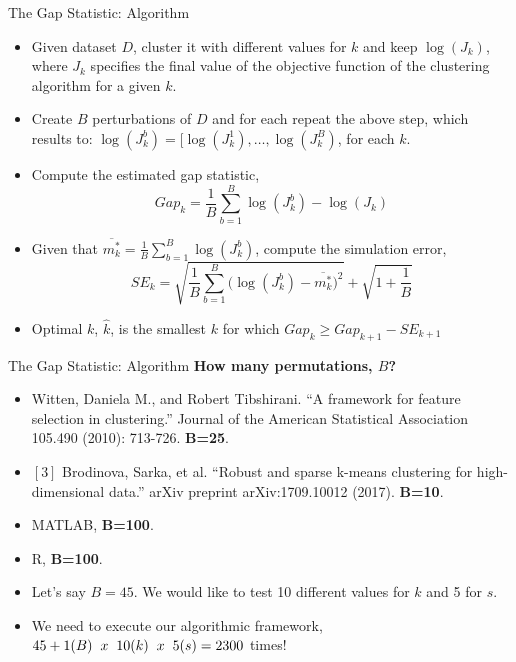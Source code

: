 \documentclass{beamer}
\newlength{\tmpShadow}
\newcommand{\MyShadow}[2]{%
	\settowidth{\tmpShadow}{#1}
	\addtolength{\tmpShadow}{.1em}
	\raisebox{-0.25ex}{\textcolor{gray!70}{#1}}%
	\kern-\tmpShadow%
	\textcolor{#2}{#1}%
}
\begin{document}
{\begin{frame}{The Gap Statistic: Algorithm}
	\begin{itemize}[label={\MyShadow{$\bullet$}{blue!80}}]
		\item Given dataset $D$, cluster it with different values for $k$ and keep $\log(J_k)$, where $J_k$ specifies the final value of the objective function of the clustering algorithm for a given $k$.
		\item Create $B$ perturbations of $D$ and for each repeat the above step, which results to: $\log(J_k^b) = [\log(J_k^1),\dots,\log(J_k^B)$, for each $k$.
		\item Compute the estimated gap statistic, 
		\begin{equation}\nonumber
		Gap_k = \frac{1}{B}\sum_{b=1}^{B}\log(J_k^b) - \log(J_k)
		\end{equation}
		\item Given that $\overline{m_k^*} = \frac{1}{B}\sum_{b=1}^{B}\log(J_k^b)$, compute the simulation error,
		\begin{equation}\nonumber
		SE_k = \sqrt{\frac{1}{B}\sum_{b=1}^{B}\bigg(\log(J_k^b)-\overline{m_k^*}\bigg)^2} + \sqrt{1+\frac{1}{B}}
		\end{equation}		
		\item Optimal $k$, $\hat{k}$, is the smallest $k$ for which $Gap_k \geq Gap_{k+1}-SE_{k+1}$ 
	\end{itemize}
\end{frame}

\begin{frame}{The Gap Statistic: Algorithm}
	\textbf{How many permutations, $B$?}
	\begin{itemize}[label={\MyShadow{$\bullet$}{blue!80}}]
		\item<2-> Witten, Daniela M., and Robert Tibshirani. ``A framework for feature selection in clustering.'' Journal of the American Statistical Association 105.490 (2010): 713-726. \textbf{B=25}.
		\vspace{3mm}	
		\item<2-> $[3]$ Brodinova, Sarka, et al. ``Robust and sparse k-means clustering for high-dimensional data.'' arXiv preprint arXiv:1709.10012 (2017). \textbf{B=10}.
		\item<3-> MATLAB, \textbf{B=100}.
		\vspace{3mm}	
		\item<3-> R, \textbf{B=100}.
	\end{itemize}
	\begin{itemize}[label={\MyShadow{$\bullet$}{red!80}}]
		\item<4-> Let's say $B = 45$. We would like to test 10 different values for $k$ and 5 for $s$.
		\item<5-> We need to execute our algorithmic framework, $45+1(B) \hphantom{x} x \hphantom{x} 10(k) \hphantom{x} x \hphantom{x} 5(s) = 2300$ times!
	\end{itemize}
\end{frame}

}
\end{document}
